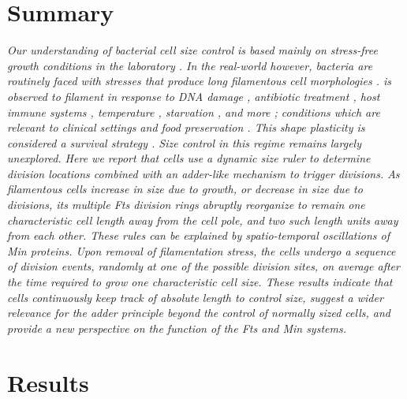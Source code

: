 \section*{Summary}
\textit{
Our understanding of bacterial cell size control is based mainly on stress-free growth conditions in the laboratory \cite{Marshall2012, Jorgensen2004, Robert2015, Chien2012, Turner2012, Wallden2016, Taheri-Araghi2014, Campos2014, Amir2014a, Osella2014}. 
In the real-world however, bacteria are routinely faced with stresses that produce long filamentous cell morphologies \cite{Suzuki1967, Rolinson1980, Miller2004, Domadia2007, Justice2006, Moller2012, Jones2004, Linn1987, Kawarai2004, Wainwright1999, Rosenberg1967, Adler1965, Kantor1966, Radman1975, Michel2005, Jones2013, Justice2008, Pulvertaft1952}. 
\ecoli is observed to filament in response to DNA damage \cite{Adler1965, Kantor1966, Radman1975, Michel2005}, antibiotic treatment \cite{Suzuki1967, Rolinson1980, Miller2004, Domadia2007, Pulvertaft1952}, host immune systems \cite{Justice2006, Moller2012}, temperature \cite{Jones2004}, starvation \cite{Wainwright1999}, and more \cite{Kawarai2004, Linn1987, Rosenberg1967}; conditions which are relevant to clinical settings and food preservation \cite{Jones2013}. 
This shape plasticity is considered a survival strategy \cite{Justice2008}. Size control in this regime remains largely unexplored. Here we report that \ecoli cells use a dynamic size ruler to determine division locations combined with an adder-like mechanism to trigger divisions. As filamentous cells increase in size due to growth, or decrease in size due to divisions, its multiple Fts division rings abruptly reorganize to remain one characteristic cell length away from the cell pole, and two such length units away from each other. These rules can be explained by spatio-temporal oscillations of Min proteins. Upon removal of filamentation stress, the cells undergo a sequence of division events, randomly at one of the possible division sites, on average after the time required to grow one characteristic cell size. These results indicate that \ecoli cells continuously keep track of absolute length to control size, suggest a wider relevance for the adder principle beyond the control of normally sized cells, and provide a new perspective on the function of the Fts and Min systems.
}



\section{Results}
